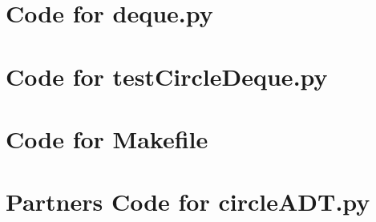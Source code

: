 \documentclass[12pt]{article}
\begin{document}
\newpage

\section{Code for deque.py} \label{CircleSect}

\noindent 

\newpage

\section{Code for testCircleDeque.py} \label{CircleSect}

\noindent 

\newpage

\section{Code for Makefile} \label{CircleSect}

\noindent 

\newpage

\section{Partners Code for circleADT.py} \label{CircleSect}

\noindent 

\newpage
\end{document}
